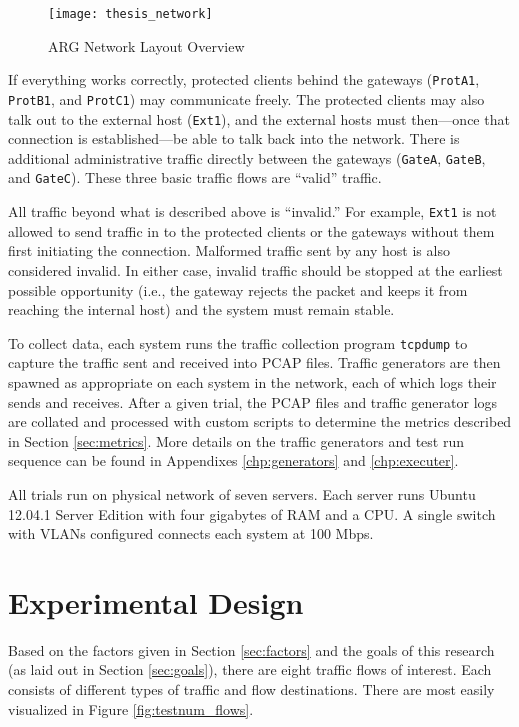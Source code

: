 \begin{figure}
	\centering
	\caption{ARG Network Layout Overview}
	\label{fig:argnetwork}
	\texttt{[image: thesis\_network]}
\end{figure}

\par If everything works correctly, protected clients behind the gateways (\texttt{ProtA1}, \texttt{ProtB1}, and \texttt{ProtC1}) may communicate freely. The protected clients may also talk out to the external host (\texttt{Ext1}), and the external hosts must then---once that connection is established---be able to talk back into the network. There is additional administrative traffic directly between the gateways (\texttt{GateA}, \texttt{GateB}, and \texttt{GateC}). These three basic traffic flows are ``valid'' traffic.

\par All traffic beyond what is described above is ``invalid.'' For example, \texttt{Ext1} is not allowed to send traffic in to the protected clients or the gateways without them first initiating the connection. Malformed traffic sent by any host is also considered invalid. In either case, invalid traffic should be stopped at the earliest possible opportunity (i.e., the gateway rejects the packet and keeps it from reaching the internal host) and the system must remain stable.

\par To collect data, each system runs the traffic collection program \texttt{tcpdump} to capture the traffic sent and received into \ac{PCAP} files. Traffic generators are then spawned as appropriate on each system in the network, each of which logs their sends and receives. After a given trial, the \ac{PCAP} files and traffic generator logs are collated and processed with custom scripts to determine the metrics described in Section \ref{sec:metrics}. More details on the traffic generators and test run sequence can be found in Appendixes \ref{chp:generators} and \ref{chp:executer}.

\par All trials run on physical network of seven servers. Each server runs Ubuntu 12.04.1 Server Edition with four gigabytes of \ac{RAM} and a  \ac{CPU}. A single switch with \ac{VLAN}s configured connects each system at 100 \ac{Mbps}.

\section{Experimental Design}
\label{sec:exp_design}
\par Based on the factors given in Section \ref{sec:factors} and the goals of this research (as laid out in Section \ref{sec:goals}), there are eight traffic flows of interest. Each consists of different types of traffic and flow destinations. There are most easily visualized in Figure \ref{fig:testnum_flows}.


